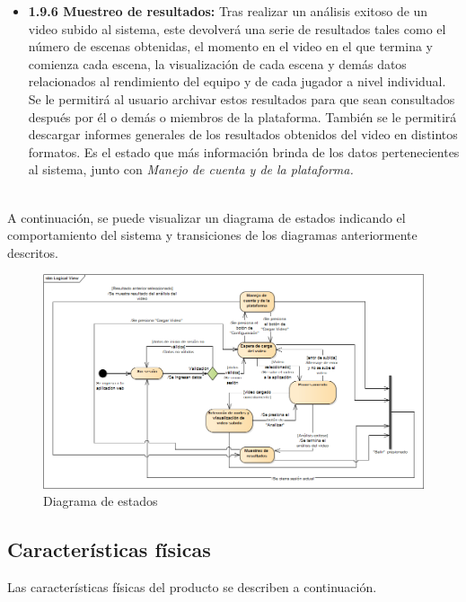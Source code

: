 \documentclass[a4paper]{article}
\newcommand\tab[1][0.55cm]{\hspace*{#1}}
\begin{document}
{\begin{itemize}
\item \textbf{1.9.6 Muestreo de resultados: } Tras realizar un análisis exitoso de un video subido al sistema, este devolverá una serie de resultados tales como el número de escenas obtenidas, el momento en el video en el que termina y comienza cada escena, la visualización de cada escena y demás datos relacionados al rendimiento del equipo y de cada jugador a nivel individual. Se le permitirá al usuario archivar estos resultados para que sean consultados después por él o demás o miembros de la plataforma. También se le permitirá descargar informes generales de los resultados obtenidos del video en distintos formatos. Es el estado que más información brinda de los datos pertenecientes al sistema, junto con \textit{Manejo de cuenta y de la plataforma.}\\  \\

\end{itemize}

A continuación, se puede visualizar un diagrama de estados indicando el comportamiento del sistema y transiciones de los diagramas anteriormente descritos. \\


\begin{figure}[h!]
  \centering
  \includegraphics[width=1\linewidth]{Diagrama_estados.png}
  \caption{Diagrama de estados }
  \label{fig:State diagram}
\end{figure}  


\color{Blue}
\subsection{Características físicas}
\color{black}
\justify 

	\tab Las características físicas del producto se describen a continuación. 

}
\end{document}
